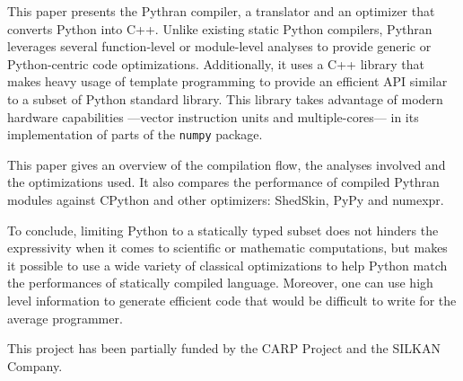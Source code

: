 \documentclass[10pt, onecolumn, preprint]{sigplanconf}
\begin{document}
This paper presents the Pythran compiler, a translator and an optimizer that
converts Python into C++. Unlike existing static Python compilers, Pythran
leverages several function-level or module-level analyses to provide
generic or Python-centric code optimizations. Additionally, it uses a C++
library that makes heavy usage of template programming to provide an efficient
API similar to a subset of Python standard library. This library takes
advantage of modern hardware capabilities ---vector instruction units and
multiple-cores--- in its implementation of parts of the \texttt{numpy} package.

This paper gives an overview of the compilation flow, the analyses involved and
the optimizations used. It also compares the performance of compiled Pythran
modules against CPython and other optimizers: ShedSkin, PyPy and numexpr.

To conclude, limiting Python to a statically typed subset does not hinders the
expressivity when it comes to scientific or mathematic computations, but makes
it possible to use a wide variety of classical optimizations to help Python
match the performances of statically compiled language. Moreover, one can use
high level information to generate efficient code that would be difficult to write for the average programmer.



\acks

This project has been partially funded by the CARP Project and the SILKAN
Company.




\end{document}
